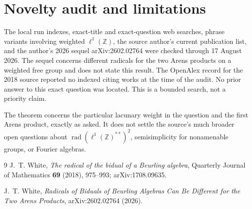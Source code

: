 \documentclass[11pt]{article}
\newcommand{\Z}{\mathbb Z}
\newcommand{\rad}{\operatorname{rad}}
\begin{document}
\section{Novelty audit and limitations}

The local run indexes, exact-title and exact-question web searches, phrase
variants involving weighted \(\ell^1(\Z)\), the source author's current
publication list, and the author's 2026 sequel arXiv:2602.02764
\cite{white2026} were checked
through 17 August 2026.  The sequel concerns different radicals for the two
Arens products on a weighted free group and does not state this result.  The
OpenAlex record for the 2018 source reported no indexed citing works at the
time of the audit.  No prior answer to this exact question was located.
This is a bounded search, not a priority claim.

The theorem concerns the particular lacunary weight in the question and the
first Arens product, exactly as asked.  It does not settle the source's much
broader open questions about \(\rad(\ell^1(\Z)^{**})^2\), semisimplicity for
nonamenable groups, or Fourier algebras.

\begin{thebibliography}{9}
J.~T. White,
\emph{The radical of the bidual of a Beurling algebra},
Quarterly Journal of Mathematics \textbf{69} (2018), 975--993;
arXiv:1708.09635.

J.~T. White,
\emph{Radicals of Biduals of Beurling Algebras Can Be Different for the Two
Arens Products}, arXiv:2602.02764 (2026).
\end{thebibliography}
\end{document}
